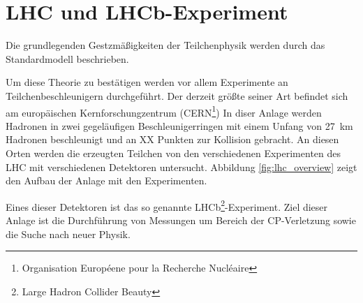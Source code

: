 \chapter{LHC und LHCb-Experiment}
Die grundlegenden Gestzmäßigkeiten der Teilchenphysik werden durch das Standardmodell beschrieben. 



Um diese Theorie zu bestätigen werden vor allem Experimente an Teilchenbeschleunigern durchgeführt.
Der derzeit größte seiner Art befindet sich am europäischen Kernforschungzentrum (CERN\footnote{Organisation Européene pour la Recherche Nucléaire})
In diser Anlage werden Hadronen in zwei gegeläufigen Beschleunigerringen mit einem Unfang von \SI{27}{\kilo\meter} Hadronen beschleunigt und an XX 
Punkten zur Kollision gebracht. An diesen Orten werden die erzeugten Teilchen von den verschiedenen Experimenten des LHC mit verschiedenen 
Detektoren untersucht. Abbildung \ref{fig:lhc_overview} zeigt den Aufbau der Anlage mit den Experimenten.

\noindent
Eines dieser Detektoren ist das so genannte LHCb\footnote{Large Hadron Collider Beauty}-Experiment. Ziel dieser Anlage ist die Durchführung
von Messungen um Bereich der CP-Verletzung sowie die Suche nach neuer Physik. 
